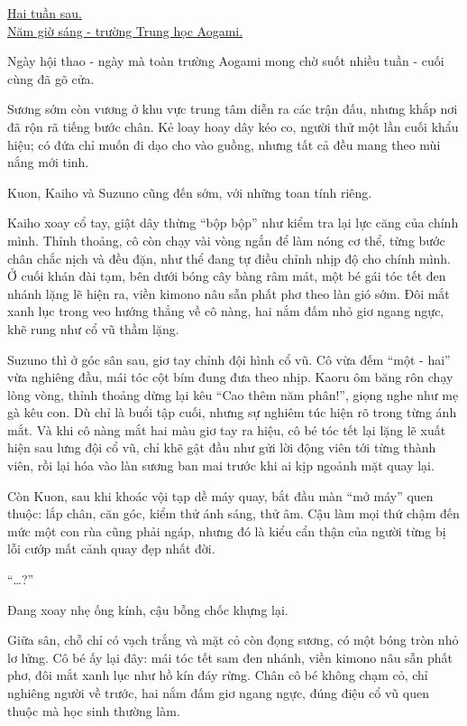 \documentclass[../main.tex]{subfiles}
\begin{document}
\begin{center}
  \uline{Hai tuần sau.\\Năm giờ sáng - trường Trung học Aogami.}
\end{center}

Ngày hội thao - ngày mà toàn trường Aogami mong chờ suốt nhiều tuần - cuối cùng đã gõ cửa.

Sương sớm còn vương ở khu vực trung tâm diễn ra các trận đấu, nhưng khắp nơi đã rộn rã tiếng bước chân. Kẻ loay hoay dây kéo co, người thử một lần cuối khẩu hiệu; có đứa chỉ muốn đi dạo cho vào guồng, nhưng tất cả đều mang theo mùi nắng mới tinh.

Kuon, Kaiho và Suzuno cũng đến sớm, với những toan tính riêng.

Kaiho xoay cổ tay, giật dây thừng ``bộp bộp'' như kiểm tra lại lực căng của chính mình. Thỉnh thoảng, cô còn chạy vài vòng ngắn để làm nóng cơ thể, từng bước chân chắc nịch và đều đặn, như thể đang tự điều chỉnh nhịp độ cho chính mình. Ở cuối khán đài tạm, bên dưới bóng cây bàng râm mát, một bé gái tóc tết đen nhánh lặng lẽ hiện ra, viền kimono nâu sẫn phất phơ theo làn gió sớm. Đôi mắt xanh lục trong veo hướng thẳng về cô nàng, hai nắm đấm nhỏ giơ ngang ngực, khẽ rung như cổ vũ thầm lặng.

Suzuno thì ở góc sân sau, giơ tay chỉnh đội hình cổ vũ. Cô vừa đếm ``một - hai'' vừa nghiêng đầu, mái tóc cột bím đung đưa theo nhịp. Kaoru ôm băng rôn chạy lòng vòng, thỉnh thoảng dừng lại kêu ``Cao thêm năm phân!'', giọng nghe như mẹ gà kêu con. Dù chỉ là buổi tập cuối, nhưng sự nghiêm túc hiện rõ trong từng ánh mắt. Và khi cô nàng mắt hai màu giơ tay ra hiệu, cô bé tóc tết lại lặng lẽ xuất hiện sau lưng đội cổ vũ, chỉ khẽ gật đầu như gửi lời động viên tới từng thành viên, rồi lại hóa vào làn sương ban mai trước khi ai kịp ngoảnh mặt quay lại.

Còn Kuon, sau khi khoác vội tạp dề máy quay, bắt đầu màn ``mở máy'' quen thuộc: lắp chân, căn góc, kiểm thử ánh sáng, thử âm. Cậu làm mọi thứ chậm đến mức một con rùa cũng phải ngáp, nhưng đó là kiểu cẩn thận của người từng bị lỗi cướp mất cảnh quay đẹp nhất đời.

``\dots?''

Đang xoay nhẹ ống kính, cậu bỗng chốc khựng lại.

Giữa sân, chỗ chỉ có vạch trắng và mặt cỏ còn đọng sương, có một bóng tròn nhỏ lơ lửng. Cô bé ấy lại đây: mái tóc tết sam đen nhánh, viền kimono nâu sẫn phất phơ, đôi mắt xanh lục như hồ kín đáy rừng. Chân cô bé không chạm cỏ, chỉ nghiêng người về trước, hai nắm đấm giơ ngang ngực, đúng điệu cổ vũ quen thuộc mà học sinh thường làm.
\end{document}
